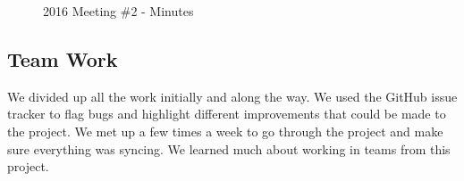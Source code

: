 \begin{figure}[H] 
	\caption{2016 Meeting \#2 - Minutes}
	\label{fig:speciation}
\end{figure}

\subsection{Team Work}
We divided up all the work initially and along the way.
We used the GitHub issue tracker to flag bugs and highlight different improvements that could be made to the project.
We met up a few times a week to go through the project and make sure everything was syncing.
We learned much about working in teams from this project.

